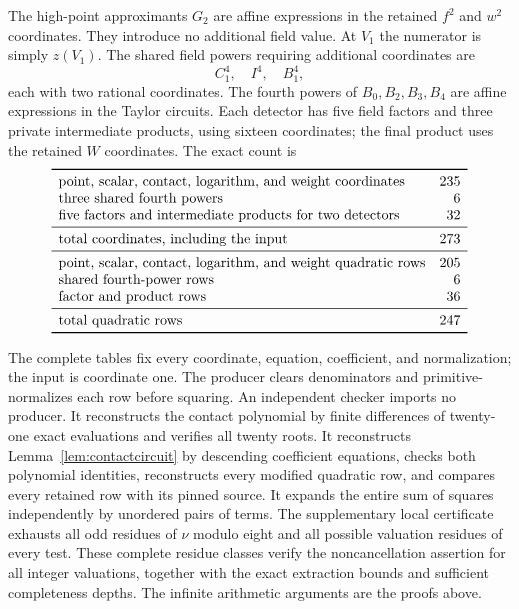 \documentclass[11pt,a4paper]{article}
\begin{document}
The high-point approximants $G_2$ are affine expressions in the
retained $f^2$ and $w^2$ coordinates. They introduce no additional
field value. At $V_1$ the numerator is simply $z(V_1)$.
The shared field powers requiring additional coordinates are
\[
                              C_1^4,\quad I^4,\quad B_1^4,
\]
each with two rational coordinates. The fourth powers of
$B_0,B_2,B_3,B_4$ are affine expressions in the Taylor circuits.
Each detector has five field factors and three private intermediate
products, using sixteen coordinates; the final product uses the
retained $W$ coordinates. The exact count is
\[
\begin{array}{lr}\toprule
\text{point, scalar, contact, logarithm, and weight coordinates}&235\\
\text{three shared fourth powers}&6\\
\text{five factors and intermediate products for two detectors}&32\\\midrule
\text{total coordinates, including the input}&273\\\midrule
\text{point, scalar, contact, logarithm, and weight quadratic rows}&205\\
\text{shared fourth-power rows}&6\\
\text{factor and product rows}&36\\\midrule
\text{total quadratic rows}&247\\\bottomrule
\end{array}
\]

The complete tables fix every coordinate, equation, coefficient, and
normalization; the input is coordinate one. The producer clears
denominators and primitive-normalizes each row before squaring.
An independent checker imports no producer. It reconstructs the
contact polynomial by finite differences of twenty-one exact
evaluations and verifies all twenty roots. It reconstructs
Lemma~\ref{lem:contactcircuit} by descending coefficient equations,
checks both polynomial identities, reconstructs every modified
quadratic row, and compares every retained row with its pinned source.
It expands the entire sum of squares independently by unordered
pairs of terms. The supplementary local certificate exhausts all
odd residues of $\nu$ modulo eight and all possible valuation residues
of every test. These complete residue classes verify the
noncancellation assertion for all integer valuations, together with
the exact extraction bounds and sufficient completeness depths.
The infinite arithmetic arguments are the proofs above.
\end{document}
